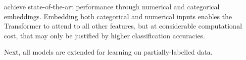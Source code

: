\textcite[][8]{gorishniyRevisitingDeepLearning2021} achieve state-of-the-art performance through numerical and categorical embeddings. Embedding both categorical and numerical inputs enables the Transformer to attend to all other features, but at considerable computational cost, that may only be justified by higher classification accuracies.

Next, all models are extended for learning on partially-labelled data.